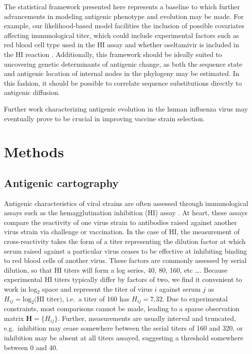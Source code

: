 \documentclass[11pt,oneside,letterpaper]{article}
\begin{document}
The statistical framework presented here represents a baseline to which further advancements in modeling antigenic phenotype and evolution may be made.
For example, our likelihood-based model facilities the inclusion of possible covariates affecting immunological titer, which could include experimental factors such as red blood cell type used in the HI assay \cite{Lin12} and whether oseltamivir is included in the HI reaction \cite{Lin10}.
Additionally, this framework should be ideally suited to uncovering genetic determinants of antigenic change, as both the sequence state and antigenic location of internal nodes in the phylogeny may be estimated.
In this fashion, it should be possible to correlate sequence substitutions directly to antigenic diffusion.

Further work characterizing antigenic evolution in the human influenza virus may eventually prove to be crucial in improving vaccine strain selection.

\section*{Methods}

\subsection*{Antigenic cartography}

Antigenic characteristics of viral strains are often assessed through immunological assays such as the hemagglutination inhibition (HI) assay \cite{Hirst43}.  
At heart, these assays compare the reactivity of one virus strain to antibodies raised against another virus strain via challenge or vaccination.  
In the case of HI, the measurement of cross-reactivity takes the form of a titer representing the dilution factor at which serum raised against a particular virus ceases to be effective at inhibiting binding to red blood cells of another virus.  
These factors are commonly assessed by serial dilution, so that HI titers will form a log series, 40, 80, 160, etc \dots.
Because experimental HI titers typically differ by factors of two, we find it convenient to work in log$_2$ space and represent the titer of virus $i$ against serum $j$ as $H_{ij} = \mathrm{log}_2 \mbox{(HI titer)}$, i.e.\ a titer of 160 has $H_{ij} = 7.32$.
Due to experimental constraints, most comparisons cannot be made, leading to a sparse observation matrix $\mathbf{H} = \{H_{ij}\}$.  
Further, measurements are usually interval and truncated, e.g.\ inhibition may cease somewhere between the serial titers of 160 and 320, or inhibition may be absent at all titers assayed, suggesting a threshold somewhere between 0 and 40.  
\end{document}
